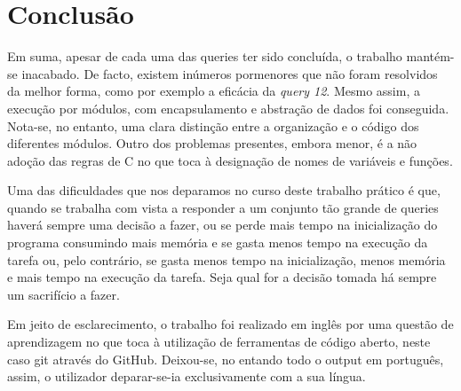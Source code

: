 \documentclass[10pt] {article}
\begin{document}
\newpage
\section{Conclusão}

\indent\par Em suma, apesar de cada uma das queries ter sido concluída, o trabalho mantém-se inacabado. De
facto, existem inúmeros pormenores que não foram resolvidos da melhor forma, como por exemplo a
eficácia da \emph{query 12}. Mesmo assim, a execução por módulos, com encapsulamento e abstração de dados
foi conseguida. Nota-se, no entanto, uma clara distinção entre a organização e o código dos diferentes módulos.
Outro dos problemas presentes, embora menor, é a não adoção das regras de C no que toca à designação de
nomes de variáveis e funções.
\par Uma das dificuldades que nos deparamos no curso deste trabalho prático é que, quando se trabalha com vista a responder a um conjunto tão grande de queries
haverá sempre uma decisão a fazer, ou se perde mais tempo na inicialização do programa consumindo mais memória e se gasta
menos tempo na execução da tarefa ou, pelo contrário, se gasta menos tempo na inicialização, menos memória e mais tempo na
execução da tarefa. Seja qual for a decisão tomada há sempre um sacrifício a fazer.
\par Em jeito de esclarecimento, o trabalho foi realizado em inglês por uma questão de aprendizagem no que toca à
utilização de ferramentas de código aberto, neste caso git através do GitHub. Deixou-se, no entando todo o output em português, assim, o utilizador
deparar-se-ia exclusivamente com a sua língua.
\end{document}
